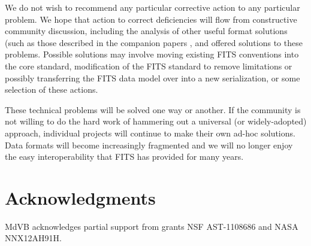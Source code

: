 \documentclass[final,authoryear,5p,times,twocolumn]{elsarticle}
\begin{document}
{{\begin{itemize}
\end{itemize}
 

We do not wish to recommend any particular corrective action to any particular 
problem. We hope that action to correct deficiencies will flow from 
constructive community discussion, including the analysis of
other useful format solutions (such as those described in the
companion papers \citep{2014Kitaeff,2014Jenness}, and offered solutions to these problems.
Possible solutions may involve moving existing FITS conventions into the core
standard, modification of the FITS standard to remove limitations or
possibly transferring the FITS data model over into a new
serialization, or some selection of these actions.


These technical problems will be solved one way or another. If the
community is not willing to do the hard work of hammering out a
universal (or widely-adopted) approach, individual projects will
continue to make their own ad-hoc solutions. Data formats will become
increasingly fragmented and we will no longer enjoy the easy
interoperability that FITS has provided for many years.



\section{Acknowledgments}


MdVB acknowledges partial support from grants NSF AST-1108686 and NASA
NNX12AH91H.




}}
\end{document}
